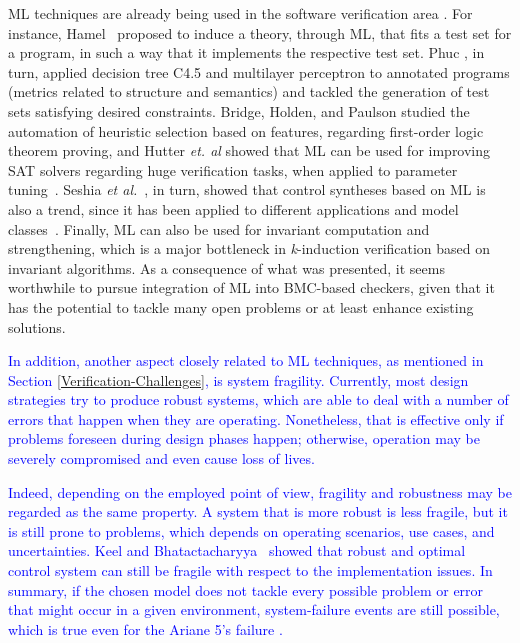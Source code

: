 \documentclass{cta-author}
\begin{document}
{{		ML techniques are already being used in the software verification area \cite{mlswverif,nguyen,bridge,babic07}. For instance, Hamel~\cite{mlswverif} proposed to induce a theory, through ML, that fits a test set for a program, in such a way that it implements the respective test set. Phuc \cite{nguyen}, in turn, applied decision tree C4.5 and multilayer perceptron to annotated programs (metrics related to structure and semantics) and tackled the generation of test sets satisfying desired constraints. Bridge, Holden, and Paulson \cite{} studied the automation of heuristic selection based on features, regarding first-order logic theorem proving, and Hutter {\it et. al} \cite{babic07} showed that ML can be used for improving SAT solvers regarding huge verification tasks, when applied to parameter tuning~\cite{babic07}. Seshia {\it et al.}~\cite{Seshia17}, in turn, showed that control syntheses based on ML is also a trend, since it has been applied to different applications and model classes~\cite{Jha10,Sadigh14}. Finally, ML can also be used for invariant computation and strengthening, which is a major bottleneck in \textit{k}-induction verification based on invariant algorithms. As a consequence of what was presented, it seems worthwhile to pursue integration of ML into BMC-based checkers, given that it has the potential to tackle many open problems or at least enhance existing solutions.
		
		\textcolor{blue}{In addition, another aspect closely related to ML techniques, as mentioned in Section \ref{Verification-Challenges}, is system fragility. Currently, most design strategies try to produce robust systems, which are able to deal with a number of errors that happen when they are operating. Nonetheless, that is effective only if problems foreseen during design phases happen; otherwise, operation may be severely compromised and even cause loss of lives.}  
		
		\textcolor{blue}{Indeed, depending on the employed point of view, fragility and robustness may be regarded as the same property. A system that is more robust is less fragile, but it is still prone to problems, which depends on operating scenarios, use cases, and uncertainties. Keel and Bhatactacharyya~\cite{bhattacharyya} showed that robust and optimal control system can still be fragile with respect to the implementation issues.  
			In summary, if the chosen model does not tackle every possible problem or error that might occur in a given environment, system-failure events are still possible, which is true even for the Ariane 5's failure \cite{antifragile}.} 
		
}}
\end{document}
